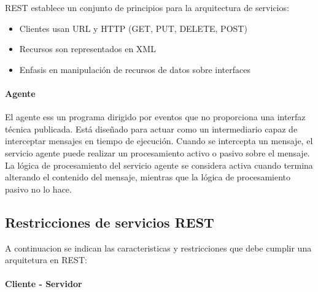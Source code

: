 	REST establece un conjunto de principios para la arquitectura de servicios:
  	\begin{itemize}			
  		\item Clientes usan URL y HTTP (GET, PUT, DELETE, POST)
  		\item Recursos son representados  en XML
  		\item Enfasis en manipulación de recursos de datos sobre interfaces			
  		
  	\end{itemize}
  	
 	
  	 \paragraph{Agente}
  	 
  	 El agente ess un programa dirigido por eventos que no proporciona una interfaz técnica publicada. Est\'a diseñado para actuar como un intermediario capaz de interceptar mensajes en tiempo de ejecución.   Cuando se intercepta un mensaje, el servicio agente puede realizar un procesamiento activo o pasivo sobre el mensaje.    	 
  	  La lógica de procesamiento del servicio agente se considera activa cuando termina alterando el contenido del mensaje, mientras que la lógica de procesamiento pasivo no lo hace. 
  	 	 
  
  \subsection{Restricciones de servicios REST}
  
  A continuacion se indican las caracteristicas y restricciones que debe cumplir una arquitetura en REST:
  \paragraph{Cliente - Servidor}
  
